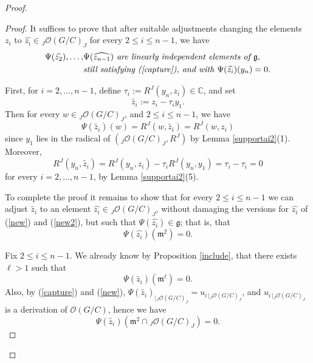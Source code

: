 \documentclass{amsart}
\numberwithin{equation}{section}
\theoremstyle{definition}
\begin{document}
\begin{proof}
\begin{proof} 
It suffices to prove that after suitable adjustments changing the elements $z_i$ to $\widehat{z_i} \in {}_J\mathcal{O}(G/C)_J$ for every $2 \leq i \leq n-1$, we have
\begin{align*} \Psi(\widehat{z_2}), \ldots ,&\Psi(\widehat{z_{n-1}}) \textit{ are linearly independent elements of }\mathfrak{g},\\
&\textit{still satisfying (\ref{capture}), and with }  \Psi(\widehat{z_i})(y_n) = 0.
\end{align*}

First, for $i = 2,\ldots , n-1$, define $\tau_i := R^J(y_n, z_i) \in \mathbb{C}$,  and set
$$ \widetilde{z_i}:= z_i - \tau_i y_1 .$$
Then for every $w \in {}_J\mathcal{O}(G/C)_J$, and $2\le i\le n-1$, we have 
\begin{equation}\label{new}
\Psi(\widetilde{z_i})(w)=R^J(w, \widetilde{z_i})= R^J(w, z_i)
\end{equation}
since $y_1$ lies in the radical of $({}_J\mathcal{O}(G/C)_J, R^J)$ by Lemma \ref{supportai2}(1). Moreover, 
\begin{equation}\label{new2} R^J(y_n, \widetilde{z_i})=R^J(y_n,z_i) - \tau_i R^J(y_n, y_1)= \tau_i - \tau_i= 0
\end{equation}
for every $i = 2, \ldots ,n-1$, by Lemma \ref{supportai2}(5).

To complete the proof it remains to show that for every $2\le i\le n-1$ we can adjust $\widetilde{z_i}$ to an element $\widehat{z_i} \in {}_J\mathcal{O}(G/C)_J$, without damaging the versions for $\widehat{z_i}$ of (\ref{new}) and (\ref{new2}), but such that $\Psi(\widehat{z_i})\in \mathfrak{g}$; that is, that 
\begin{equation}\label{sort} \Psi(\widehat{z_i})(\mathfrak{m}^2)=0. 
\end{equation}

Fix $2 \leq i \leq n-1$. We already know by Proposition \ref{include}, that there exists $\ell > 1$ such that
\begin{equation}\label{limit} \Psi(\widetilde{z_i})(\mathfrak{m}^{\ell})= 0.
\end{equation}
Also, by (\ref{capture}) and (\ref{new}), $\Psi(\widetilde{z_i})_{|{}_J\mathcal{O}(G/C)_J} = u_{i\, |{}_J\mathcal{O}(G/C)_J}$, and $u_{i\, |{}_J\mathcal{O}(G/C)_J}$ is a derivation of $\mathcal{O}(G/C)$, hence we have
\begin{equation}\label{safe} \Psi(\widetilde{z_i})\left(\mathfrak{m}^2 \cap {}_J\mathcal{O}(G/C)_J\right)=0.
\end{equation}


\end{proof}
\end{proof}
\end{document}
